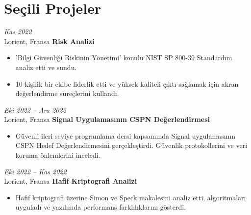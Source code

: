 \section{Seçili Projeler}

\begin{twocolentry}{
    \textit{Kas 2022}\\
    \small Lorient, Fransa}
    \normalsize \textbf{Risk Analizi}
    \small
    \begin{itemize}
        \item 'Bilgi Güvenliği Riskinin Yönetimi' konulu NIST SP 800-39 Standardını analiz etti ve sundu.
        \item 10 kişilik bir ekibe liderlik etti ve yüksek kaliteli çıktı sağlamak için akran değerlendirme süreçlerini kullandı.
    \end{itemize}    
\end{twocolentry}

\vspace{\betweenentryspace}

\begin{twocolentry}{
    \textit{Eki 2022 – Ara 2022}\\
    \small Lorient, Fransa}
    \normalsize \textbf{Signal Uygulamasının CSPN Değerlendirmesi}
    \small
    \begin{itemize}
        \item Güvenli ileri seviye programlama dersi kapsamında Signal uygulamasının CSPN Hedef Değerlendirmesini gerçekleştirdi. Güvenlik protokollerini ve veri koruma önlemlerini inceledi.
    \end{itemize}
\end{twocolentry}

\vspace{\betweenentryspace}

\begin{twocolentry}{
    \textit{Eki 2022 – Kas 2022}\\
    \small Lorient, Fransa}
    \normalsize \textbf{Hafif Kriptografi Analizi}
    \small
    \begin{itemize}
        \item Hafif kriptografi üzerine Simon ve Speck makalesini analiz etti, algoritmaları uyguladı ve yazılımda performans farklılıklarını gösterdi.
    \end{itemize}
\end{twocolentry}
